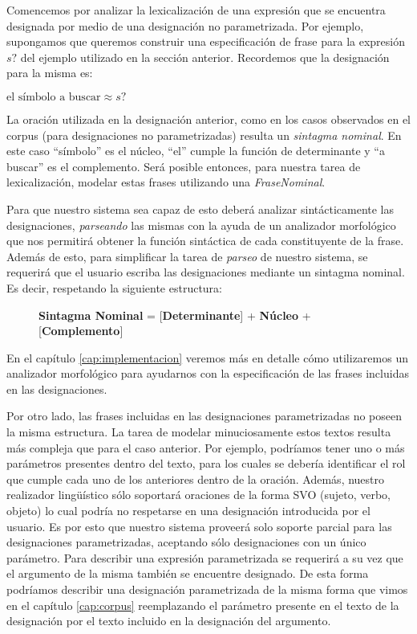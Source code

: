 Comencemos por analizar la lexicalización de una expresión que se encuentra designada por medio de una designación no parametrizada. Por ejemplo, supongamos que queremos construir una especificación de frase para la expresión $s?$ del ejemplo utilizado en la sección anterior. Recordemos que la designación para la misma es:

\begin{center} 
  $\text{el símbolo a buscar} \approx s?$ 
\end{center}

La oración utilizada en la designación anterior, como en los casos observados en el corpus (para designaciones no parametrizadas) resulta un \emph{sintagma nominal}. En este caso ``símbolo'' es el núcleo, ``el'' cumple la función de determinante y ``a buscar'' es el complemento. Será posible entonces, para nuestra tarea de lexicalización, modelar estas frases utilizando una \emph{FraseNominal}. 

Para que nuestro sistema sea capaz de esto deberá analizar sintácticamente las designaciones, \textit{parseando} las mismas con la ayuda de un analizador morfológico que nos permitirá obtener la función sintáctica de cada constituyente de la frase. Además de esto, para simplificar la tarea de \emph{parseo} de nuestro sistema, se requerirá que el usuario escriba las designaciones mediante un sintagma nominal. Es decir, respetando la siguiente estructura:

\begin{figure}[H]
  \centering
   \textbf{Sintagma Nominal} = [\textbf{Determinante}] + \textbf{Núcleo} + [\textbf{Complemento}]
\end{figure}

En el capítulo \ref{cap:implementacion} veremos más en detalle cómo utilizaremos un analizador morfológico para ayudarnos con la especificación de las frases incluidas en las designaciones.

Por otro lado, las frases incluidas en las designaciones parametrizadas no poseen la misma estructura. La tarea de modelar minuciosamente estos textos resulta más compleja que para el caso anterior. Por ejemplo, podríamos tener uno o más parámetros presentes dentro del texto, para los cuales se debería identificar el rol que cumple cada uno de los anteriores dentro de la oración. Además, nuestro realizador lingüístico sólo soportará oraciones de la forma SVO (sujeto, verbo, objeto) lo cual podría no respetarse en una designación introducida por el usuario. Es por esto que nuestro sistema proveerá solo soporte parcial para las designaciones parametrizadas, aceptando sólo designaciones con un único parámetro. Para describir una expresión parametrizada se requerirá a su vez que el argumento de la misma también se encuentre designado. De esta forma podríamos describir una designación parametrizada de la misma forma que vimos en el capítulo \ref{cap:corpus} reemplazando el parámetro presente en el texto de la designación por el texto incluido en la designación del argumento.

